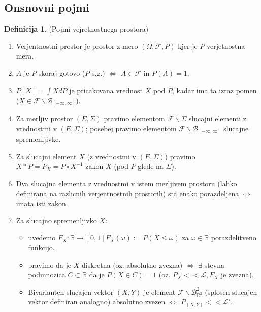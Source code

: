 \documentclass[a4paper,12pt]{article}
\theoremstyle{definition} %
\newtheorem{definicija}{Definicija}[section]
\theoremstyle{plain} %
\newcommand{\R}{\mathbb{R}}
\newcommand{\F}{\mathcal{F}}
\newcommand{\Le}{\mathcal{L}}
\begin{document}
    \subsection{Onsnovni pojmi}
        \begin{definicija}(Pojmi vejretnostnega prostora)
            \begin{enumerate}
                \item Verjentnostni prostor je prostor z mero $(\Omega, \F, P)$ kjer je $P$ verjetnostna mera.
                \item $A$ je $P$-skoraj gotovo ($P$-s.g.) $\iff$ $A\in \F$ in $P(A) = 1$.
                \item $P[X] = \int XdP$ je pricakovana vrednost $X$ pod $P$, kadar ima ta izraz pomen ($X \in \F\backslash\mathcal{B}_{[-\infty, \infty]}$).
                \item Za merljiv prostor $(E, \Sigma)$ pravimo elementom $\F\backslash\Sigma$ slucajni elementi z vrednostmi v $(E, \Sigma)$; posebej pravimo elementom $\F\backslash\mathcal{B}_{[-\infty, \infty]}$ slucajne spremenljivke.
                \item Za slucajni element  $X$ (z vrednostmi v $(E, \Sigma)$) pravimo $X*P = P_X = P\circ X^{-1}$ zakon $X$ (pod $P$ glede na $\Sigma$).
                \item Dva slucajna elementa z vrednostmi v istem merljivem prostoru (lahko definirana na razlicnih verjentnostnih prostorih) sta enako porazdeljena $\iff$ imata isti zakon.
                \item Za slucajno spremenljivko $X$:
                    \begin{itemize}
                        \item uvedemo $F_X:\R\rightarrow[0, 1] F_X(\omega):= P(X\leq\omega)$ za $\omega \in \R$ porazdelitveno funkcijo.
                        \item pravimo da je $X$ diskretna (oz. absolutno zvezna) $\iff$ $\exists$ stevna podmnozica $C \subset \R$ da je $P(X\in C) = 1$ (oz. $P_X << \Le, F_X$ je zvezna).
                        \item Bivarianten slucajen vektor $(X, Y)$ je element $\F\backslash\mathcal{B}_{\R^2}^2$ (splosen slucajen vektor definiran analogno) absolutno zvezen $\iff$ $P_{(X, Y)} << \Le'$. 
                    \end{itemize}
            \end{enumerate}
        \end{definicija}
\end{document}
